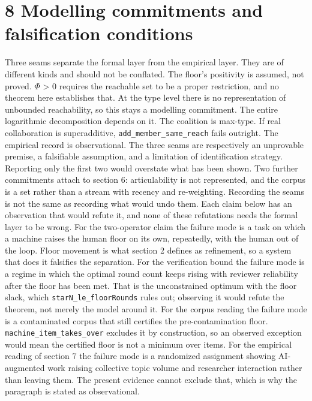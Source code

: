 \documentclass[11pt,a4paper]{article}
\theoremstyle{definition}
\theoremstyle{remark}
\begin{document}
\section*{8  Modelling commitments and falsification conditions}
Three seams separate the formal layer from the empirical layer. They are of different kinds and should not be conflated.
The floor's positivity is assumed, not proved. $Φ$ > 0 requires the reachable set to be a proper restriction, and no theorem here establishes that. At the type level there is no representation of unbounded reachability, so this stays a modelling commitment. The entire logarithmic decomposition depends on it.
The coalition is max-type. If real collaboration is superadditive, \texttt{add\_\allowbreak{}member\_\allowbreak{}same\_\allowbreak{}reach} fails outright.
The empirical record is observational. The three seams are respectively an unprovable premise, a falsifiable assumption, and a limitation of identification strategy. Reporting only the first two would overstate what has been shown.
Two further commitments attach to section 6: articulability is not represented, and the corpus is a set rather than a stream with recency and re-weighting.
Recording the seams is not the same as recording what would undo them. Each claim below has an observation that would refute it, and none of these refutations needs the formal layer to be wrong.
For the two-operator claim the failure mode is a task on which a machine raises the human floor on its own, repeatedly, with the human out of the loop. Floor movement is what section 2 defines as refinement, so a system that does it falsifies the separation.
For the verification bound the failure mode is a regime in which the optimal round count keeps rising with reviewer reliability after the floor has been met. That is the unconstrained optimum with the floor slack, which \texttt{starN\_\allowbreak{}le\_\allowbreak{}floorRounds} rules out; observing it would refute the theorem, not merely the model around it.
For the corpus reading the failure mode is a contaminated corpus that still certifies the pre-contamination floor. \texttt{machine\_\allowbreak{}item\_\allowbreak{}takes\_\allowbreak{}over} excludes it by construction, so an observed exception would mean the certified floor is not a minimum over items.
For the empirical reading of section 7 the failure mode is a randomized assignment showing AI-augmented work raising collective topic volume and researcher interaction rather than leaving them. The present evidence cannot exclude that, which is why the paragraph is stated as observational.
\end{document}
